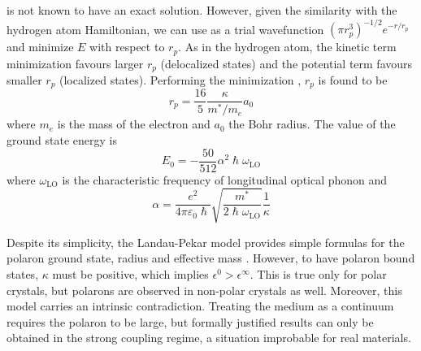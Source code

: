  is not known to have an exact solution. However, given the similarity with the hydrogen atom Hamiltonian, we can use as a trial wavefunction $(\pi r_p^3)^{-1/2} e^{-r/r_p}$ and minimize $E$ with respect to $r_p$. As in the hydrogen atom, the kinetic term minimization favours larger $r_p$ (delocalized states) and the potential term favours smaller $r_p$ (localized states). Performing the minimization \cite{alexandrov2010}, $r_p$ is found to be
\begin{equation}
    r_p = \frac{16}{5} \frac{\kappa}{m^*/m_e} a_0
\end{equation}
where $m_e$ is the mass of the electron and $a_0$ the Bohr radius. The value of the ground state energy is
\begin{equation}
    E_0 = -\frac{50}{512} \alpha^2 \hslash \omega_\text{LO}
\end{equation}
where $\omega_\text{LO}$ is the characteristic frequency of longitudinal optical phonon and
\begin{equation}
    \alpha = \frac{e^2}{4\pi\varepsilon_0\hslash} \sqrt{\frac{m^*}{2\hslash\omega_\text{LO}}} \frac{1}{\kappa}
\end{equation}

Despite its simplicity, the Landau-Pekar model provides simple formulas for the polaron ground state, radius and effective mass \cite{landau1948}. However, to have polaron bound states, $\kappa$ must be positive, which implies $\epsilon^0 > \epsilon^\infty$. This is true only for polar crystals, but polarons are observed in non-polar crystals as well. Moreover, this model carries an intrinsic contradiction. Treating the medium as a continuum requires the polaron to be large, but formally justified results can only be obtained in the strong coupling regime, a situation improbable for real materials.